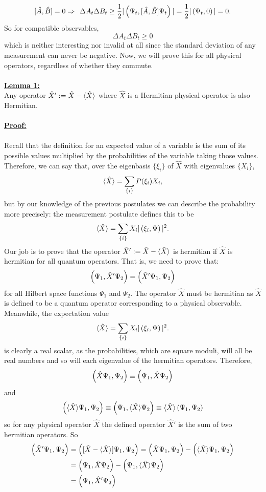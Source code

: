 $$
[\hat{A},\hat{B}]=0 \Rightarrow\:\: \Delta A_{t}\Delta B_{t}\geq\frac{1}{2}|\left(\Psi_{t},[\hat{A},\hat{B}]\Psi_{t}\right)| = \frac{1}{2}|\left(\Psi_{t},0\right) |=0. 
$$
So for compatible observables, 
$$
\Delta A_{t}\Delta B_{t}\geq 0
$$
which is neither interesting nor invalid at all since the standard deviation of any measurement can never be negative. Now, we will prove this for all physical operators, regardless of whether they commute.
\\\\
\underline{\textbf{Lemma 1:}}\\
Any operator $\hat{X}':=\hat{X}-\langle\hat{X}\rangle$ where $\hat{X}$ is a Hermitian physical operator is also Hermitian.\\\\
\underline{\textbf{Proof:}}\\\\
Recall that the definition for an expected value of a variable is the sum of its possible values multiplied by the probabilities of the variable taking those values. Therefore, we can say that, over the eigenbasis $\{\xi_{i}\}$ of $\hat{X}$ with eigenvalues $\{X_{i}\}$, 
$$
\langle\hat{X}\rangle=\sum_{\{i\}}P(\xi_{i})X_{i},
$$
but by our knowledge of the previous postulates we can describe the probability more precisely: the measurement postulate defines this to be
$$
\langle\hat{X}\rangle=\sum_{\{i\}}X_{i}|\left(\xi_{i},\Psi\right)|^2.
$$
Our job is to prove that the operator $\hat{X}':=\hat{X}-\langle\hat{X}\rangle$ is hermitian if $\hat{X}$ is hermitian for all quantum operators. That is, we need to prove that:
$$
\left(\Psi_{1},\hat{X}'\Psi_{2}\right)=\left(\hat{X}'\Psi_{1},\Psi_{2}\right)
$$
for all Hilbert space functions $\Psi_{1}$ and $\Psi_{2}$. The operator $\hat{X}$ must be hermitian as $\hat{X}$ is defined to be a quantum operator corresponding to a physical observable. Meanwhile, the expectation value
$$
\langle\hat{X}\rangle=\sum_{\{i\}}X_{i}|\left(\xi_{i},\Psi\right)|^2.
$$
is clearly a real scalar, as the probabilities, which are square moduli, will all be real numbers and so will each eigenvalue of the hermitian operators. Therefore, 
$$
\left(\hat{X}\Psi_{1},\Psi_{2}\right)\equiv\left(\Psi_{1},\hat{X}\Psi_{2}\right)
$$
and 
$$
\left(\langle\hat{X}\rangle\Psi_{1},\Psi_{2}\right)\equiv\left(\Psi_{1},\langle\hat{X}\rangle\Psi_{2}\right)\equiv\langle\hat{X}\rangle\left(\Psi_{1},\Psi_{2}\right)
$$
so for any physical operator $\hat{X}$ the defined operator $\hat{X}'$ is the sum of two hermitian operators. So
$$
\begin{aligned}
\left(\hat{X}'\Psi_{1},\Psi_{2}\right)&=\left([\hat{X}-\langle\hat{X}\rangle]\Psi_{1},\Psi_{2}\right)=\left(\hat{X}\Psi_{1},\Psi_{2}\right)-\left(\langle\hat{X}\rangle\Psi_{1},\Psi_{2}\right)\\
&=\left(\Psi_{1},\hat{X}\Psi_{2}\right)-\left(\Psi_{1},\langle\hat{X}\rangle\Psi_{2}\right)\\
&=\left(\Psi_{1},\hat{X}'\Psi_{2}\right)
\end{aligned}
$$

